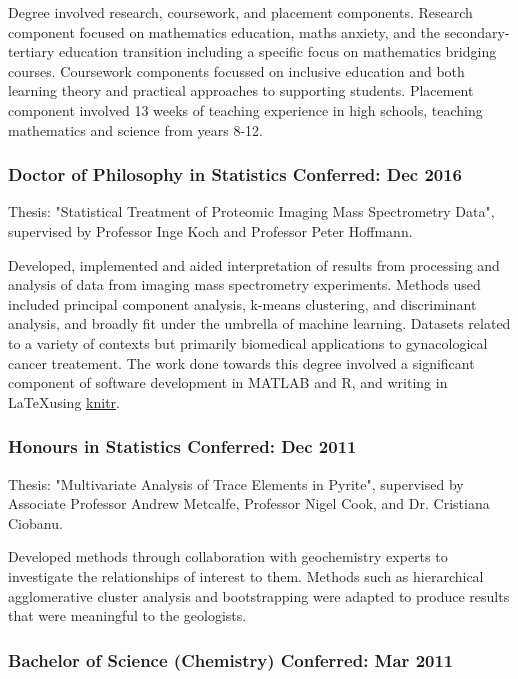 \documentclass[a4paper,12pt]{report}
\begin{document}
Degree involved research, coursework, and placement components. Research component focused on mathematics education, maths anxiety, and the secondary-tertiary education transition including a specific focus on mathematics bridging courses. Coursework components focussed on inclusive education and both learning theory and practical approaches to supporting students. Placement component involved 13 weeks of teaching experience in high schools, teaching mathematics and science from years 8-12.


\subsubsection*{Doctor of Philosophy in Statistics \hfill Conferred: Dec 2016} \vspace{-6pt}
Thesis: "Statistical Treatment of Proteomic Imaging Mass Spectrometry Data", supervised by Professor Inge Koch and Professor Peter Hoffmann.

Developed, implemented and aided interpretation of results from processing and analysis of data from imaging mass spectrometry experiments. Methods used included principal component analysis, k-means clustering, and discriminant analysis, and broadly fit under the umbrella of machine learning. Datasets related to a variety of contexts but primarily biomedical applications to gynacological cancer treatement. The work done towards this degree involved a significant component of software development in MATLAB and R, and writing in \LaTeX using  \href{https://yihui.name/knitr/}{knitr}.

\subsubsection*{Honours in Statistics \hfill Conferred: Dec 2011} \vspace{-6pt}
Thesis: "Multivariate Analysis of Trace Elements in Pyrite", supervised by Associate Professor Andrew Metcalfe, Professor Nigel Cook, and Dr. Cristiana Ciobanu.

Developed methods through collaboration with geochemistry experts to investigate the relationships of interest to them. Methods such as hierarchical agglomerative cluster analysis and bootstrapping were adapted to produce results that were meaningful to the geologists.


\subsubsection*{Bachelor of Science (Chemistry) \hfill Conferred: Mar 2011}
\end{document}
